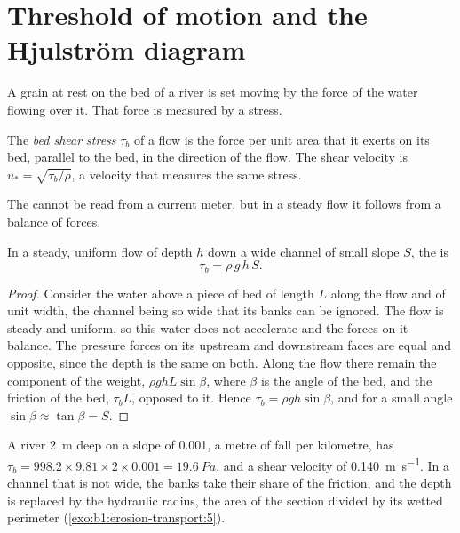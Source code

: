 \section{Threshold of motion and the Hjulström diagram}\label{sec:b1:erosion-transport:threshold}

A grain at rest on the bed of a river is set moving by the force of the water
flowing over it. That force is measured by a stress.

\begin{definition}\label{def:b1:erosion-transport:bed-shear}
The \emph{bed shear stress} $\tau_b$ of a flow is the
force per unit area that it exerts on its bed, parallel to the bed, in the
direction of the flow. The shear velocity is $u_* = \sqrt{\tau_b/\rho}$, a
velocity that measures the same stress.
\end{definition}

The  cannot be read from a current meter, but in a steady flow
it follows from a balance of forces.

\begin{proposition}\label{prop:b1:erosion-transport:depth-slope}
In a steady, uniform flow of depth $h$ down a wide channel of small slope $S$,
the  is
\[
  \tau_b = \rho\,g\,h\,S .
\]
\end{proposition}

\begin{proof}
Consider the water above a piece of bed of length $L$ along the flow and of
unit width, the channel being so wide that its banks can be ignored. The flow
is steady and uniform, so this water does not accelerate and the forces on it
balance. The pressure forces on its upstream and downstream faces are equal and
opposite, since the depth is the same on both. Along the flow there remain the
component of the weight, $\rho g h L \sin\beta$, where $\beta$ is the angle of
the bed, and the friction of the bed, $\tau_b L$, opposed to it. Hence $\tau_b
= \rho g h \sin\beta$, and for a small angle $\sin\beta \approx \tan\beta = S$.
\end{proof}

A river \qty{2}{m} deep on a slope of \num{0.001}, a metre of fall per
kilometre, has $\tau_b = 998.2 \times 9.81 \times 2 \times 0.001 =
\qty{19.6}{Pa}$, and a shear velocity of \qty{0.140}{m.s^{-1}}. In a channel
that is not wide, the banks take their share of the friction, and the depth is
replaced by the hydraulic radius, the area of the section divided by its wetted
perimeter (\cref{exo:b1:erosion-transport:5}).

